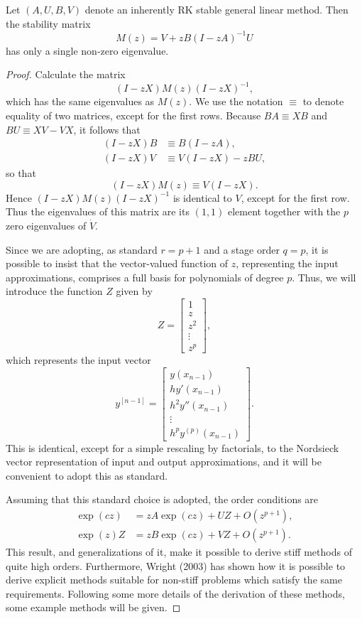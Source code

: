 \begin{theorem}

  \label{thm:551B}
Let $(A, U, B, V)$ denote an inherently RK stable general linear method. Then the stability matrix
\[
M(z) = V + zB(I - zA)^{-1}U
\]
has only a single non-zero eigenvalue.
\end{theorem}

\begin{proof}
Calculate the matrix
\[
(I - zX)M(z)(I - zX)^{-1},
\]
which has the same eigenvalues as $M(z)$. We use the notation $\equiv$ to denote equality of two matrices, except for the first rows. Because $BA \equiv XB$ and $BU \equiv XV - VX$, it follows that
\begin{align*}
(I - zX)B &\equiv B(I - zA), \\
(I - zX)V &\equiv V(I - zX) - zBU,
\end{align*}
so that
\[
(I - zX)M(z) \equiv V(I - zX).
\]
Hence $(I - zX)M(z)(I - zX)^{-1}$ is identical to $V$, except for the first row. Thus the eigenvalues of this matrix are its $(1, 1)$ element together with the $p$ zero eigenvalues of $\dot{V}$.

Since we are adopting, as standard $r = p + 1$ and a stage order $q = p$, it is possible to insist that the vector-valued function of $z$, representing the input approximations, comprises a full basis for polynomials of degree $p$. Thus, we will introduce the function $Z$ given by
\[
Z = \begin{bmatrix}
1 \\ z \\ z^2 \\ \vdots \\ z^p
\end{bmatrix}, \tag{551b}
\]
which represents the input vector
\[
y^{[n-1]} = \begin{bmatrix}
y(x_{n-1}) \\
hy'(x_{n-1}) \\
h^2 y''(x_{n-1}) \\
\vdots \\
h^p y^{(p)}(x_{n-1})
\end{bmatrix}. \tag{551c}
\]
This is identical, except for a simple rescaling by factorials, to the Nordsieck vector representation of input and output approximations, and it will be convenient to adopt this as standard.

Assuming that this standard choice is adopted, the order conditions are
\begin{align}
\exp(cz) &= zA \exp(cz) + U Z + O(z^{p+1}), \tag{551d} \\
\exp(z)Z &= zB \exp(cz) + V Z + O(z^{p+1}). \tag{551e}
\end{align}
This result, and generalizations of it, make it possible to derive stiff methods of quite high orders. Furthermore, Wright (2003) has shown how it is possible to derive explicit methods suitable for non-stiff problems which satisfy the same requirements. Following some more details of the derivation of these methods, some example methods will be given.
\end{proof}

